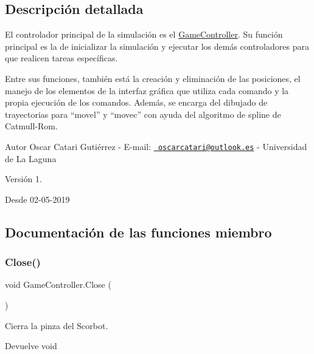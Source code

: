 \subsection{Descripción detallada}
El controlador principal de la simulación es el \mbox{\hyperlink{class_game_controller}{Game\+Controller}}. Su función principal es la de inicializar la simulación y ejecutar los demás controladores para que realicen tareas específicas.

Entre sus funciones, también está la creación y eliminación de las posiciones, el manejo de los elementos de la interfaz gráfica que utiliza cada comando y la propia ejecución de los comandos. Además, se encarga del dibujado de trayectorias para “movel” y “movec” con ayuda del algoritmo de spline de Catmull-\/\+Rom. \begin{DoxyAuthor}{Autor}
Oscar Catari Gutiérrez -\/ E-\/mail\+: \href{mailto:oscarcatari@outlook.es}{\texttt{ oscarcatari@outlook.\+es}} -\/ Universidad de La Laguna 
\end{DoxyAuthor}
\begin{DoxyVersion}{Versión}
1. 
\end{DoxyVersion}
\begin{DoxySince}{Desde}
02-\/05-\/2019 
\end{DoxySince}


\subsection{Documentación de las funciones miembro}
\mbox{\label{class_game_controller_a232d433ba9f07944bcc274841bf8cc7c}} 
\subsubsection{\texorpdfstring{Close()}{Close()}}
{\footnotesize\ttfamily void Game\+Controller.\+Close (\begin{DoxyParamCaption}{ }\end{DoxyParamCaption})\hspace{0.3cm}{\ttfamily [inline]}}

Cierra la pinza del Scorbot. \begin{DoxyReturn}{Devuelve}
void 
\end{DoxyReturn}
\mbox{\label{class_game_controller_a2ea8f0a42452c5dd938feed2713f87c7}} 
